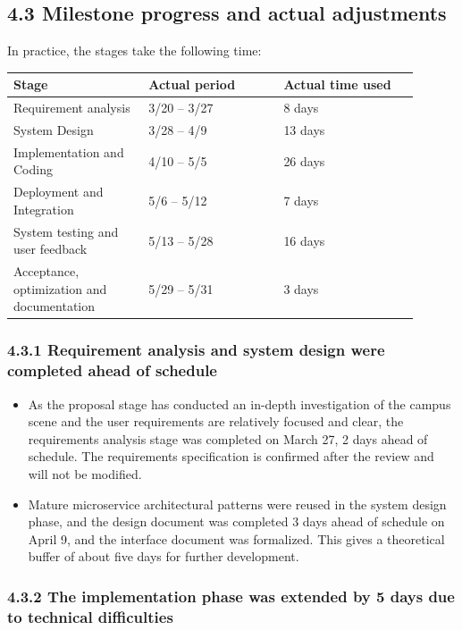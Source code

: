 \documentclass{article}
\begin{document}
\subsection{4.3 Milestone progress and actual adjustments}

In practice, the stages take the following time:

\begin{longtable}{p{0.30\linewidth}p{0.30\linewidth}p{0.30\linewidth}}
\toprule
\textbf{Stage} & \textbf{Actual period} & \textbf{Actual time used} \\
\midrule
Requirement analysis & 3/20 – 3/27 & 8 days \\
System Design & 3/28 – 4/9 & 13 days \\
Implementation and Coding & 4/10 – 5/5 & 26 days \\
Deployment and Integration & 5/6 – 5/12 & 7 days \\
System testing and user feedback & 5/13 – 5/28 & 16 days \\
Acceptance, optimization and documentation & 5/29 – 5/31 & 3 days \\
\bottomrule
\end{longtable}

\subsubsection{4.3.1 Requirement analysis and system design were completed ahead of schedule}

\begin{itemize}
    \item As the proposal stage has conducted an in-depth investigation of the campus scene and the user requirements are relatively focused and clear, the requirements analysis stage was completed on March 27, 2 days ahead of schedule. The requirements specification is confirmed after the review and will not be modified.
    \item Mature microservice architectural patterns were reused in the system design phase, and the design document was completed 3 days ahead of schedule on April 9, and the interface document was formalized. This gives a theoretical buffer of about five days for further development.
\end{itemize}

\subsubsection{4.3.2 The implementation phase was extended by 5 days due to technical difficulties}
\end{document}
